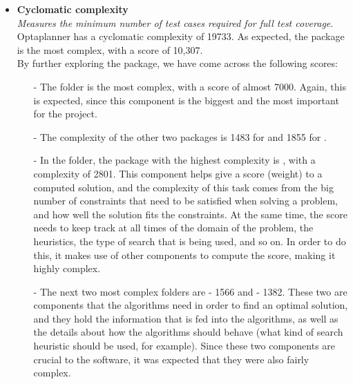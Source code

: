             \begin{itemize}
                \item \textbf{Cyclomatic complexity} \\
                \textit{Measures the minimum number of test cases required for full test coverage}.\\ Optaplanner has a cyclomatic complexity of 19733. As expected, the  package is the most complex, with a score of 10,307.\\
                By further exploring the package, we have come across the following scores:
                \begin{itemize}
                    \item[-] The  folder is the most complex, with a score of almost 7000. Again, this is expected, since this component is the biggest and the most important for the project. 
                    \item[-] The complexity of the other two packages is 1483 for  and 1855 for . 
                    \item[-] In the  folder, the package with the highest complexity is , with a complexity of 2801. This component helps give a score (weight) to a computed solution, and the complexity of this task comes from the big number of constraints that need to be satisfied when solving a problem, and how well the solution fits the constraints. At the same time, the score needs to keep track at all times of the domain of the problem, the heuristics, the type of search that is being used, and so on. In order to do this, it makes use of other components to compute the score, making it highly complex.
                    \item[-] The next two most complex folders are  - 1566 and  - 1382. These two are components that the algorithms need in order to find an optimal solution, and they hold the information that is fed into the algorithms, as well as the details about how the algorithms should behave (what kind of search heuristic should be used, for example). Since these two components are crucial to the software, it was expected that they were also fairly complex. 
                \end{itemize}
                

\end{itemize}
